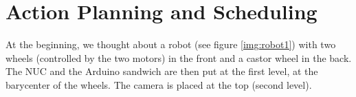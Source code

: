 \section{Action Planning and Scheduling}

At the beginning, we thought about a robot (see figure \ref{img:robot1}) with two wheels (controlled by the two motors) in the front and a castor wheel in the back. The NUC and the Arduino sandwich are then put at the first level, at the barycenter of the wheels. The camera is placed at the top (second level).
